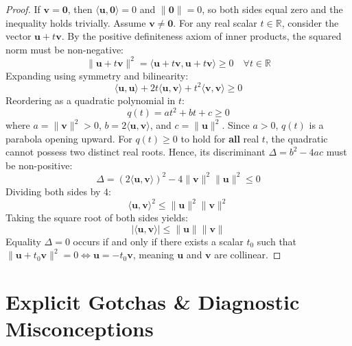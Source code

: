\begin{proof}
If $\mathbf{v} = \mathbf{0}$, then $\langle \mathbf{u}, \mathbf{0} \rangle = 0$ and $\|\mathbf{0}\| = 0$, so both sides equal zero and the inequality holds trivially.
Assume $\mathbf{v} \neq \mathbf{0}$. For any real scalar $t \in \mathbb{R}$, consider the vector $\mathbf{u} + t\mathbf{v}$. By the positive definiteness axiom of inner products, the squared norm must be non-negative:
\begin{equation*}
\|\mathbf{u} + t\mathbf{v}\|^2 = \langle \mathbf{u} + t\mathbf{v}, \mathbf{u} + t\mathbf{v} \rangle \ge 0 \quad \forall t \in \mathbb{R}
\end{equation*}
Expanding using symmetry and bilinearity:
\begin{equation*}
\langle \mathbf{u}, \mathbf{u} \rangle + 2t \langle \mathbf{u}, \mathbf{v} \rangle + t^2 \langle \mathbf{v}, \mathbf{v} \rangle \ge 0
\end{equation*}
Reordering as a quadratic polynomial in $t$:
\begin{equation*}
q(t) = a t^2 + b t + c \ge 0
\end{equation*}
where $a = \|\mathbf{v}\|^2 > 0$, $b = 2\langle \mathbf{u}, \mathbf{v} \rangle$, and $c = \|\mathbf{u}\|^2$.
Since $a > 0$, $q(t)$ is a parabola opening upward. For $q(t) \ge 0$ to hold for \textbf{all} real $t$, the quadratic cannot possess two distinct real roots. Hence, its discriminant $\Delta = b^2 - 4ac$ must be non-positive:
\begin{equation*}
\Delta = (2\langle \mathbf{u}, \mathbf{v} \rangle)^2 - 4 \|\mathbf{v}\|^2 \|\mathbf{u}\|^2 \le 0
\end{equation*}
Dividing both sides by 4:
\begin{equation*}
\langle \mathbf{u}, \mathbf{v} \rangle^2 \le \|\mathbf{u}\|^2 \|\mathbf{v}\|^2
\end{equation*}
Taking the square root of both sides yields:
\begin{equation*}
|\langle \mathbf{u}, \mathbf{v} \rangle| \le \|\mathbf{u}\| \|\mathbf{v}\|
\end{equation*}
Equality $\Delta = 0$ occurs if and only if there exists a scalar $t_0$ such that $\|\mathbf{u} + t_0 \mathbf{v}\|^2 = 0 \iff \mathbf{u} = -t_0 \mathbf{v}$, meaning $\mathbf{u}$ and $\mathbf{v}$ are collinear.
\end{proof}

\section{Explicit Gotchas \& Diagnostic Misconceptions}

